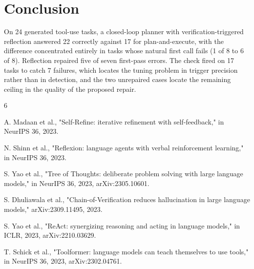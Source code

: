 \documentclass[runningheads,a4paper]{llncs}
\begin{document}
\section{Conclusion}

On 24 generated tool-use tasks, a closed-loop planner with verification-triggered reflection answered 22 correctly against 17 for plan-and-execute, with the difference concentrated entirely in tasks whose natural first call fails (1 of 8 to 6 of 8). Reflection repaired five of seven first-pass errors. The check fired on 17 tasks to catch 7 failures, which locates the tuning problem in trigger precision rather than in detection, and the two unrepaired cases locate the remaining ceiling in the quality of the proposed repair.

\begin{thebibliography}{6}

\small

\setlength{\itemsep}{0pt}

\setlength{\parskip}{0pt}

 A. Madaan et al., "Self-Refine: iterative refinement with self-feedback," in NeurIPS 36, 2023.

 N. Shinn et al., "Reflexion: language agents with verbal reinforcement learning," in NeurIPS 36, 2023.

 S. Yao et al., "Tree of Thoughts: deliberate problem solving with large language models," in NeurIPS 36, 2023, arXiv:2305.10601.

 S. Dhuliawala et al., "Chain-of-Verification reduces hallucination in large language models," arXiv:2309.11495, 2023.

 S. Yao et al., "ReAct: synergizing reasoning and acting in language models," in ICLR, 2023, arXiv:2210.03629.

 T. Schick et al., "Toolformer: language models can teach themselves to use tools," in NeurIPS 36, 2023, arXiv:2302.04761.

\end{thebibliography}
\end{document}
